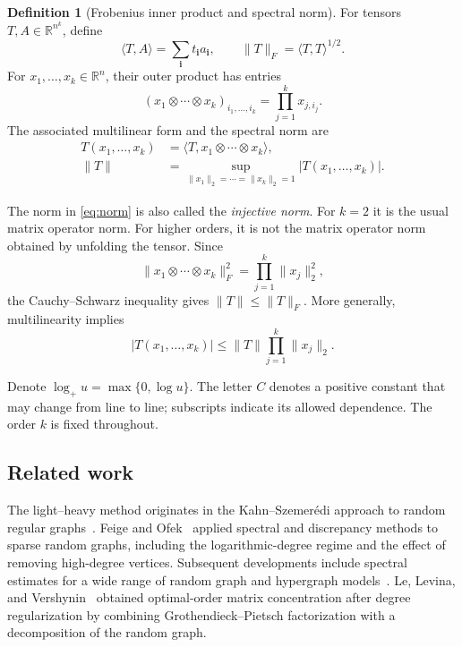 \documentclass[11pt,reqno]{amsart}
\numberwithin{equation}{section}
\theoremstyle{definition}
\newtheorem{definition}[theorem]{Definition}
\theoremstyle{remark}
\newcommand{\R}{\mathbb R}
\begin{document}
\begin{definition}[Frobenius inner product and spectral norm]
For tensors $T,A\in\R^{n^k}$, define
\[
 \langle T,A\rangle
 =\sum_{\mathbf i}t_{\mathbf i}a_{\mathbf i},
 \qquad
 \|T\|_F=\langle T,T\rangle^{1/2}.
\]
For $x_1,\ldots,x_k\in\R^n$, their outer product has entries
\[
 (x_1\otimes\cdots\otimes x_k)_{i_1,\ldots,i_k}
 =\prod_{j=1}^k x_{j,i_j}.
\]
The associated multilinear form and the spectral norm are
\begin{align}
 T(x_1,\ldots,x_k)&=\langle T,x_1\otimes\cdots\otimes x_k\rangle,
 \label{eq:form}\\
 \|T\|&=\sup_{\|x_1\|_2=\cdots=\|x_k\|_2=1}
                 |T(x_1,\ldots,x_k)|.
 \label{eq:norm}
\end{align}
\end{definition}

The norm in \eqref{eq:norm} is also called the \textit{injective norm}.
For $k=2$ it is the usual matrix operator norm. For higher orders,
it is not the matrix operator norm obtained by unfolding the tensor.
Since
\[
 \|x_1\otimes\cdots\otimes x_k\|_F^2
 =\prod_{j=1}^k\|x_j\|_2^2,
\]
the Cauchy--Schwarz inequality gives $\|T\|\le\|T\|_F$.
More generally, multilinearity implies
\begin{equation}\label{eq:homogeneity}
 |T(x_1,\ldots,x_k)|\le\|T\|\prod_{j=1}^k\|x_j\|_2.
\end{equation}


Denote
$\log_+u=\max\{0,\log u\}$. The letter $C$ denotes a positive
constant that may change from line to line; subscripts indicate its
allowed dependence. The order $k$ is fixed throughout.

\subsection{Related work}\label{sec:related}

The light--heavy method originates in the Kahn--Szemer\'edi approach
to random regular graphs~\cite{FKS89}. Feige and Ofek~\cite{FO05} applied spectral
and discrepancy methods to sparse random graphs, including the
logarithmic-degree regime and the effect of removing high-degree
vertices.
Subsequent developments include spectral estimates for a wide range of random graph
and hypergraph models~\cite{BFSU98,LR15,DJPP13,CGJ18,TY19,Z23,DWZ25}.
Le, Levina, and Vershynin~\cite{LLV17} obtained optimal-order matrix
concentration after degree regularization by combining
Grothendieck--Pietsch factorization with a decomposition of the random
graph.
\end{document}
